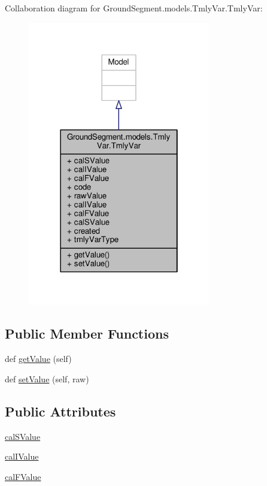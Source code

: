 Collaboration diagram for Ground\+Segment.\+models.\+Tmly\+Var.\+Tmly\+Var\+:\nopagebreak
\begin{figure}[H]
\begin{center}
\leavevmode
\includegraphics[width=226pt]{class_ground_segment_1_1models_1_1_tmly_var_1_1_tmly_var__coll__graph}
\end{center}
\end{figure}
\subsection*{Public Member Functions}
\begin{DoxyCompactItemize}
\item 
def \hyperlink{class_ground_segment_1_1models_1_1_tmly_var_1_1_tmly_var_a1362e4d2da768ea8415d93ef8a355735}{get\+Value} (self)
\item 
def \hyperlink{class_ground_segment_1_1models_1_1_tmly_var_1_1_tmly_var_af46e07b1dea3c04a0b165c93067139a7}{set\+Value} (self, raw)
\end{DoxyCompactItemize}
\subsection*{Public Attributes}
\begin{DoxyCompactItemize}
\item 
\hyperlink{class_ground_segment_1_1models_1_1_tmly_var_1_1_tmly_var_ae310487e7ceeb1bbeae164bf4aec0290}{cal\+S\+Value}
\item 
\hyperlink{class_ground_segment_1_1models_1_1_tmly_var_1_1_tmly_var_a11e7f1de5e00c2422fc42474312d8e23}{cal\+I\+Value}
\item 
\hyperlink{class_ground_segment_1_1models_1_1_tmly_var_1_1_tmly_var_aea75651bdf109b3105ef8b477f0985cc}{cal\+F\+Value}
\end{DoxyCompactItemize}
